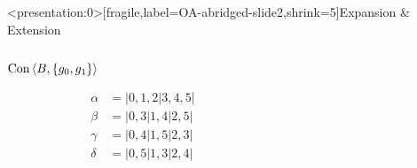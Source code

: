\begin{frame}<presentation:0>[fragile,label=OA-abridged-slide2,shrink=5]{Expansion \& Extension}
  \begin{columns}
    \begin{column}{0.3\textwidth}
      \begin{center}
        $\mathrm{Con\,} \langle B,\{g_0, g_1\}\rangle$

        \vskip-2pt
        \begin{align*}
          \alpha &= |0, 1, 2|3, 4, 5|\\[4pt]
          \beta &= |0, 3|1, 4 |2, 5| \\[3pt]
          \gamma &= |0, 4|1, 5|2, 3| \\[3pt]
          \delta &= |0, 5|1, 3|2, 4| 
        \end{align*}
      \end{center}
    \end{column}

    \begin{column}{0.4\textwidth}
    \end{column}
  \end{columns}


\end{frame}
